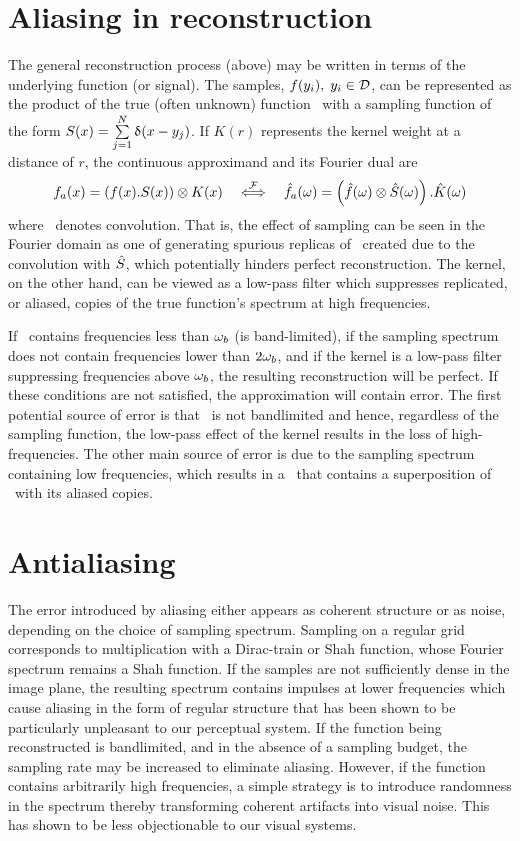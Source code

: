 \documentclass[11pt,fleqn]{book} %
\begin{document}
\section{Aliasing in reconstruction}
The general reconstruction process (above) may be written in terms of the underlying function (or signal). The samples, $f(y_i), \; y_i \in \mathcal{D}$, can be represented as the  product of the true (often unknown) function \ifn\ with a sampling function of the form $S(x) = \sum\limits_{j=1}^{N} \updelta(x-y_j)$. 
If $K(r)$ represents the kernel weight at a distance of $r$, the continuous approximand and its Fourier dual are
\begin{equation} \label{eq:recons}
 {\ensuremath{f}}_a(x) = \left(f(x) . S(x) \right) \otimes K(x) \quad \overset{\mathcal{F}}{\Longleftrightarrow}\quad  
 {\ensuremath{\hat{f}}}_a(\omega) = \left(\hat{f}(\omega) \otimes \hat{S}(\omega)\right) . \hat{K}(\omega) 
\end{equation}
where \conv\ denotes convolution. That is, the effect of sampling can be seen in the Fourier domain as one of generating spurious replicas of \IFsym\, created due to the convolution with $\hat{S}$, which potentially hinders perfect reconstruction.   The kernel, on the other hand, can be viewed as a low-pass filter which suppresses replicated, or aliased, copies of the true function's spectrum at high frequencies. 

If \ifn\ contains frequencies less than $\omega_b$ (is band-limited), if the sampling spectrum does not contain frequencies lower than $2\omega_b$, and if the kernel is a low-pass filter suppressing frequencies above $\omega_b$, the resulting reconstruction will be perfect. If these conditions are not satisfied, the approximation will contain error. The first potential source of error is that \ifn\ is not bandlimited and hence, regardless of the sampling function, the low-pass effect of the kernel results in the loss of high-frequencies. The other main source of error is due to the sampling spectrum containing low frequencies, which results in a \FTsym{\appr{\ifsym}}\ that contains a superposition of \IFn\ with its aliased copies.

\section{Antialiasing}
The error introduced by aliasing either appears as coherent structure or as noise, depending on the choice of sampling spectrum. Sampling on a regular grid corresponds to multiplication with a Dirac-train or Shah function, whose Fourier spectrum remains a Shah function. If the samples are not sufficiently dense in the image plane, the resulting spectrum contains impulses at lower frequencies which cause aliasing in the form of regular structure that has been shown to be particularly unpleasant to our perceptual system. If the function being reconstructed is bandlimited, and in the absence of a sampling budget, the sampling rate may be increased to eliminate aliasing. However, if the function contains arbitrarily high frequencies, a simple strategy is to introduce randomness in the spectrum thereby transforming coherent artifacts into visual noise. This has shown to be less objectionable to our visual systems.
\end{document}
